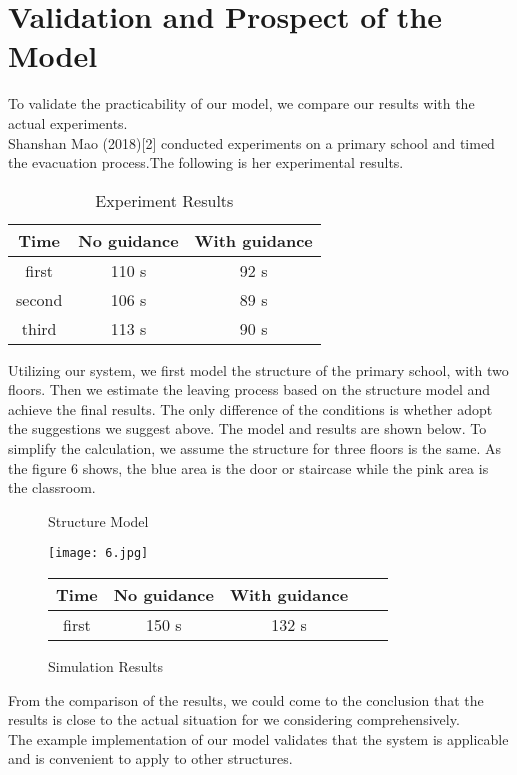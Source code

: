 \documentclass{mcmthesis}
\begin{document}
\section{Validation and Prospect of the Model}
\noindent To validate the practicability of our model, we compare our results with the actual experiments.\\
\indent Shanshan Mao (2018)[2] conducted experiments on a  primary school and timed the evacuation process.The following is her experimental results.\\
\begin{table}[htbp]
	\centering
	\caption{Experiment Results}
	\begin{tabular}{@{}ccc@{}}
		\toprule
		Time   & No guidance & With guidance     \\ \midrule
		first  & 110 s  & 92 s        \\
		second & 106 s  & 89 s        \\
		third  & 113 s  & 90 s        \\ \bottomrule
	\end{tabular}
\end{table}
\par\indent Utilizing our system, we first model the structure of the primary school, with two floors. Then we estimate the leaving process based on the structure model and achieve the final results. The only difference of the conditions is whether adopt the suggestions we suggest above. The model and results are shown below. To simplify the calculation, we assume the structure for three floors is the same. As the figure 6 shows, the blue area is the door or staircase while the pink area is the classroom.\\
\begin{figure}[htbp]
	\centering
	\begin{minipage}[htbp]{10.0cm}
		\centering
		\caption{Structure Model}
		\texttt{[image: 6.jpg]}
	\end{minipage}
	\begin{minipage}[htbp]{8.0cm}
		\centering
		\caption{Simulation Results}
		\begin{tabular}{@{}cccll@{}}
			\toprule
			Time   & No guidance & With guidance &  &  \\ \midrule
			first  & 150 s  & 132 s    &  &  \\ \bottomrule
		\end{tabular}
	\end{minipage}
\end{figure}
\par\indent From the comparison of the results, we could come to the conclusion that the results is close to the actual situation for we considering comprehensively. \\
\indent The example implementation of our model validates that the system is applicable and is convenient to apply to other structures.
\end{document}
